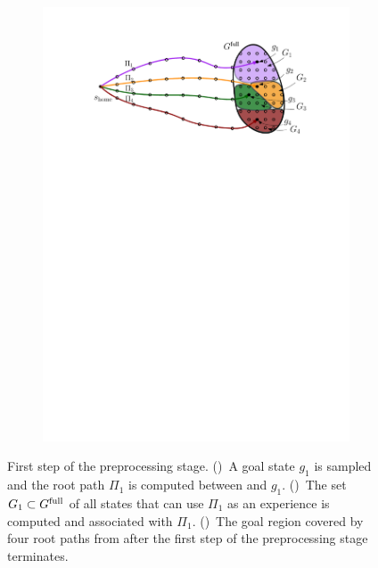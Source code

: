 \documentclass[conference]{IEEEtran}
\begin{document}
\begin{figure}[t]
\begin{subfigure}{0.3\textwidth}
        \includegraphics[width=\textwidth]{2_compute_root_paths_3}
        \caption{}
        \label{fig:crp3}
    \end{subfigure}
    \caption{First step of the preprocessing stage.
    ()~A goal state $g_1$ is sampled and the root path $\Pi_1$ is computed between \Shome and $g_1$.
    ()~The set $G_1 \subset G^{\textrm{full}}$ of all states that can use $\Pi_1$ as an experience is computed and associated with $\Pi_1$.
    ()~The goal region covered by four root paths from \Shome after the first step of the preprocessing stage terminates.
    }
    \label{fig:crp}
\end{figure}
\end{document}
